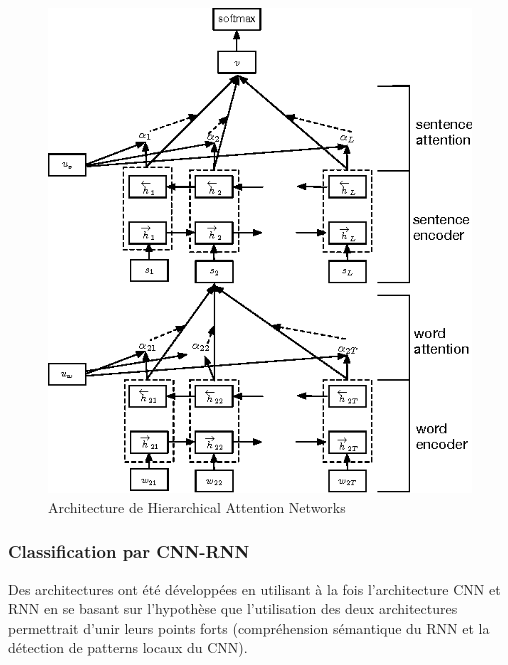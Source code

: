 \begin{figure}
\centering
\includegraphics[scale=0.3]{./tex/natural-language-processing/hierachical.png}
\caption{Architecture de Hierarchical Attention Networks}
\label{hierarchical}
\end{figure}

\subsubsection{Classification par CNN-RNN}
Des architectures ont été développées en utilisant à la fois l'architecture CNN et RNN en se basant sur l'hypothèse que l'utilisation des deux architectures permettrait d'unir leurs points forts (compréhension sémantique du RNN et la détection de patterns locaux du CNN).\\

